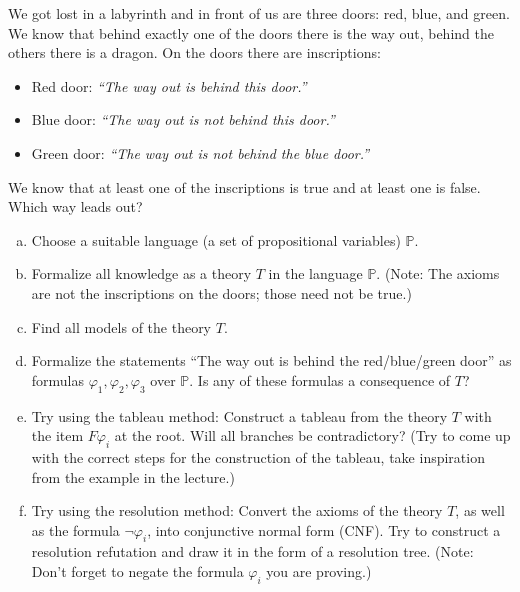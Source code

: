 \begin{problem}\label{problem:dragons}
    
    We got lost in a labyrinth and in front of us are three doors: red, blue, and green. We know that behind exactly one of the doors there is the way out, behind the others there is a dragon. On the doors there are inscriptions:
    \begin{itemize}
        \item Red door: {\it ``The way out is behind this door.''}
        \item Blue door: {\it ``The way out is not behind this door.''}
        \item Green door: {\it ``The way out is not behind the blue door.''}
    \end{itemize}
    We know that at least one of the inscriptions is true and at least one is false. Which way leads out?
    \begin{enumerate}[(a)]
        \item Choose a suitable language (a set of propositional variables) $\mathbb P$.
        \item Formalize all knowledge as a theory $T$ in the language $\mathbb P$. (Note: The axioms are not the inscriptions on the doors; those need not be true.)
        \item Find all models of the theory $T$.
        \item Formalize the statements ``The way out is behind the red/blue/green door'' as formulas $\varphi_1,\varphi_2,\varphi_3$ over $\mathbb P$. Is any of these formulas a consequence of $T$?
        \item Try using the tableau method: Construct a tableau from the theory $T$ with the item $F\varphi_i$ at the root. Will all branches be contradictory? (Try to come up with the correct steps for the construction of the tableau, take inspiration from the example in the lecture.)
        \item Try using the resolution method: Convert the axioms of the theory $T$, as well as the formula $\neg\varphi_i$, into conjunctive normal form (CNF). Try to construct a resolution refutation and draw it in the form of a resolution tree. (Note: Don’t forget to negate the formula $\varphi_i$ you are proving.)
    \end{enumerate}  


\end{problem}
